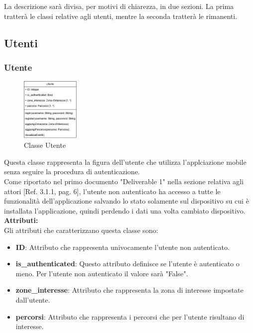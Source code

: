 \documentclass{article}
\begin{document}
La descrizione sarà divisa, per motivi di chiarezza, in due sezioni. La prima tratterà le classi relative agli utenti, mentre la seconda tratterà le rimanenti.\\

\subsection{Utenti}

\subsubsection{Utente}

\begin{figure}[htbp]
    \centering
    \includegraphics[width=0.25\textwidth]{Images/utente_class.png}
    \caption{Classe Utente}
    \label{fig:utente}
\end{figure}

Questa classe rappresenta la figura dell'utente che utilizza l'applciazione mobile senza seguire la procedura di autenticazione.\\
Come riportato nel primo documento "Deliverable 1" nella sezione relativa agli attori [Ref. 3.1.1, pag. 6], l'utente non autenticato ha accesso a tutte le funzionalità dell'applicazione salvando lo stato solamente sul dispositivo su cui è installata l'applicazione, quindi perdendo i dati una volta cambiato dispositivo.\\

\textbf{Attributi:}\\

Gli attributi che caratterizzano questa classe sono:
\begin{itemize}
    \item \textbf{ID}: Attributo che rappresenta univocamente l'utente non autenticato.
    \item \textbf{is\_authenticated}: Questo attributo definisce se l'utente è autenticato o meno. Per l'utente non autenticato il valore sarà "False".
    \item \textbf{zone\_interesse}: Attributo che rappresenta la zona di interesse impostate dall'utente.
    \item \textbf{percorsi}: Attributo che rappresenta i percorsi che per l'utente risultano di interesse.
\end{itemize}
 
\end{document}
